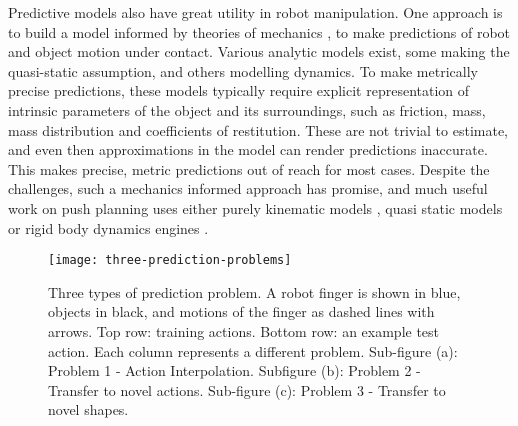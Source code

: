 Predictive models also have great utility in robot manipulation. One approach is to build a model informed by theories of mechanics \citep{mason_manipulator_1982,lynch_mechanics_1992,lynchmason96,peshkin_motion_1988,cappelleri_designing_2006,mason_mechanics_2001,flickinger2015},  to make predictions of robot and object motion under contact. Various analytic models exist, some making the quasi-static assumption, and others modelling dynamics. 
To make metrically precise predictions, these models typically require explicit representation of intrinsic parameters of the object and its surroundings, such as friction, mass, mass distribution and coefficients of restitution. These are not trivial to estimate, and even then approximations in the model can render predictions inaccurate. This makes precise, metric predictions out of reach for most cases. Despite the challenges, such a mechanics informed approach has promise, and much useful work on push planning uses either purely kinematic models \citep{stillman08ijrr}, quasi static models \citep{Dogar_2010,lynchmason96} or rigid body dynamics engines \cite{zitoetal-iros12,Cosgun2011}. 
\def\stackalignment{l}
\begin{figure*}[t]
\centerline{\texttt{[image: three-prediction-problems]}}
\caption{Three types of prediction problem. A robot finger is shown in blue, objects in black, and motions of the finger as dashed lines with arrows. Top row: training actions. Bottom row: an example test action. Each column represents a different problem. Sub-figure (a): Problem 1 - Action Interpolation. Subfigure (b): Problem 2 - Transfer to novel actions. Sub-figure (c): Problem 3 - Transfer to novel shapes. \label{fig:three-prediction-problems}}
\end{figure*}

